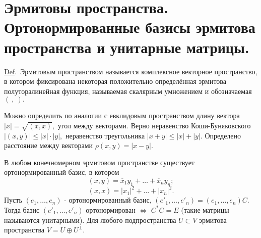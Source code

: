 \documentclass[draft]{article}%
\newcommand{\de}{\par\noindent\underline{Def}.\ }%
\newcommand{\ab}{\par\noindent}%
\newcommand{\baz}[1]{\left(#1_1,\dots,#1_n\right)}%
\newcommand{\lr}{\Leftrightarrow}%
\newcommand{\ps}{\oplus}
\renewcommand{\le}{\leqslant}
\begin{document}
\section{Эрмитовы пространства. Ортонормированные базисы эрмитова\\ пространства и унитарные матрицы.}
\label{q23} %
\de Эрмитовым пространством называется комплексное векторное пространство, в котором фиксирована некоторая
положительно определённая эрмитова полуторалинейная функция, называемая скалярным умножением и обозначаемая $(\
,\ ).$ %
\ab Можно определить по аналогии с евклидовым пространством длину вектора $|x|=\sqrt{(x,x)},$ угол между
векторами. Верно неравенство Коши-Буняковского $|(x,y)|\le |x|\cdot|y|,$ неравенство треугольника
$|x+y|\le|x|+|y|.$ Определено расстояние между векторами $\rho(x,y)=|x-y|.$ %
\ab В любом конечномерном эрмитовом пространстве существует ортонормированный базис, в котором
$$
(x,y)=\overline{x}_1y_1+\dots+\overline{x}_{n}y_{n};$$
$$
(x,x)=|x_1|^2+\dots+|x_{n}|^2.
$$
Пусть $\baz{e}$ - ортонормированный базис, $\baz{e'}=\baz{e}C.$\\ Тогда базис $\baz{e'}$ ортонормирован $\lr$ %
$C^*C=E$ (такие матрицы называются унитарными). %
Для любого подпространства $U\subset V$ эрмитова пространства $V=U\ps U^\bot.$

%
%
\end{document}
